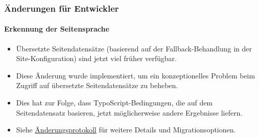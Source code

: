 %

\begin{frame}[fragile]
	\frametitle{Änderungen für Entwickler}
	\framesubtitle{Erkennung der Seitensprache}


	\begin{itemize}
		\item Übersetzte Seitendatensätze (basierend auf der Fallback-Behandlung in der Site-Konfiguration)
			sind jetzt viel früher verfügbar.
		\item Diese Änderung wurde implementiert, um ein konzeptionelles Problem beim
			Zugriff auf übersetzte Seitendatensätze zu beheben.
		\item Dies hat zur Folge, dass TypoScript-Bedingungen, die auf dem Seitendatensatz
			basieren, jetzt möglicherweise andere Ergebnisse liefern.
		\item Siehe \href{https://docs.typo3.org/c/typo3/cms-core/master/en-us/Changelog/11.0/Breaking-23736-PageLanguageDetectionSetEarlierInFrontendRequestProcess.html}{Änderungsprotokoll}
			für weitere Details und Migrationsoptionen.
	\end{itemize}

\end{frame}

